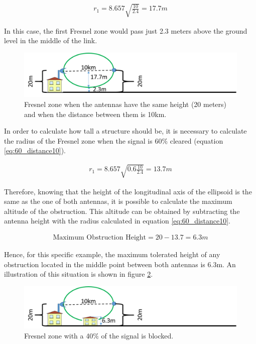 \begin{align}
r_1 = 8.657\sqrt{\frac{10}{2.4}} = 17.7m\label{eq:100_distance10}
\end{align}

In this case, the first Fresnel zone would pass just 2.3 meters above the ground level in the middle of the link. 

\begin{figure}[H]
	\centering
	\includegraphics[scale=0.50]{figures/fresnel_10km_height.png}
	\caption{Fresnel zone when the antennas have the same height (20 meters) and when the distance between them is 10km.}
	\label{fig:fresnel_zones_10km_height}
\end{figure}  

In order to calculate how tall a structure should be, it is necessary to calculate the radius of the Fresnel zone when the signal is 60$\%$ cleared (equation \ref{eq:60_distance10}).

\begin{align}
r_1 = 8.657\sqrt{0.6 \frac{10}{2.4}} = 13.7m\label{eq:60_distance10}
\end{align}
  
Therefore, knowing that the height of the longitudinal axis of the ellipsoid is the same as the one of both antennas, it is possible to calculate the maximum altitude of the obstruction. This altitude can be obtained by subtracting the antenna height with the radius calculated in equation \ref{eq:60_distance10}.

\begin{align}
\text{Maximum Obstruction Height} = 20 - 13.7 = 6.3m\label{eq:height_obstruction}
\end{align}

Hence, for this specific example, the maximum tolerated height of any obstruction located in the middle point between both antennas is 6.3m. An illustration of this situation is shown in figure \ref{fig:fresnel_zones_10km_60procent}.

\begin{figure}[H]
	\centering
	\includegraphics[scale=0.50]{figures/fresnel_10km_60procent.png}
	\caption{Fresnel zone with a 40$\%$ of the signal is blocked.}
	\label{fig:fresnel_zones_10km_60procent}
\end{figure}  


